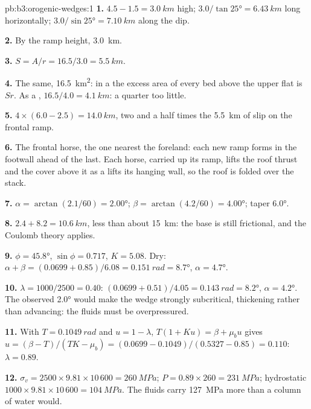 \begin{solution}{pb:b3:orogenic-wedges:1}
\textbf{1.} $4.5 - 1.5 = \qty{3.0}{km}$ high; $3.0/\tan\ang{25} =
\qty{6.43}{km}$ long horizontally; $3.0/\sin\ang{25} = \qty{7.10}{km}$ along
the dip.

\textbf{2.} By the ramp height, \qty{3.0}{km}.

\textbf{3.} $S = A/r = 16.5/3.0 = \qty{5.5}{km}$.

\textbf{4.} The same, \qty{16.5}{km^2}: in a  the excess area
of every bed above the upper flat is $Sr$. As a , $16.5/4.0 =
\qty{4.1}{km}$: a quarter too little.

\textbf{5.} $4\times(6.0 - 2.5) = \qty{14.0}{km}$, two and a half times the
\qty{5.5}{km} of slip on the frontal ramp.

\textbf{6.} The frontal horse, the one nearest the foreland: each new ramp
forms in the footwall ahead of the last. Each horse, carried up its ramp,
lifts the roof thrust and the cover above it as a  lifts its
hanging wall, so the roof is folded over the stack.

\textbf{7.} $\alpha = \arctan(2.1/60) = \ang{2.00}$; $\beta =
\arctan(4.2/60) = \ang{4.00}$; taper \ang{6.0}.

\textbf{8.} $2.4 + 8.2 = \qty{10.6}{km}$, less than about \qty{15}{km}: the
base is still frictional, and the Coulomb theory applies.

\textbf{9.} $\phi = \ang{45.8}$, $\sin\phi = 0.717$, $K = 5.08$. Dry:
$\alpha + \beta = (0.0699 + 0.85)/6.08 = \qty{0.151}{rad} = \ang{8.7}$,
$\alpha = \ang{4.7}$.

\textbf{10.} $\lambda = 1000/2500 = 0.40$: $(0.0699 + 0.51)/4.05 =
\qty{0.143}{rad} = \ang{8.2}$, $\alpha = \ang{4.2}$. The observed \ang{2.0}
would make the wedge strongly subcritical, thickening rather than advancing:
the fluids must be overpressured.

\textbf{11.} With $T = \qty{0.1049}{rad}$ and $u = 1 - \lambda$, $T(1 + Ku) =
\beta + \mu_bu$ gives $u = (\beta - T)/(TK - \mu_b) = (0.0699 -
0.1049)/(0.5327 - 0.85) = 0.110$: $\lambda = 0.89$.

\textbf{12.} $\sigma_v = 2500\times9.81\times10\,600 = \qty{260}{MPa}$; $P =
0.89\times260 = \qty{231}{MPa}$; hydrostatic $1000\times9.81\times10\,600 =
\qty{104}{MPa}$. The fluids carry \qty{127}{MPa} more than a column of
water would.


\end{solution}
